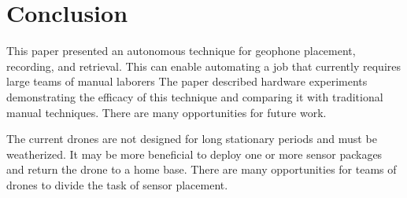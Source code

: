  \section{Conclusion}\label{sec:Conclusion}
This paper presented an autonomous technique for geophone placement, recording, and retrieval.  This can enable automating a job that currently requires large teams of manual laborers 
 The paper described hardware experiments demonstrating the efficacy of this technique and comparing it with traditional manual techniques.
 There are many opportunities for future work.  
 
 The current drones are not designed for long stationary periods and must be weatherized.  It may be more beneficial to deploy one or more sensor packages and return the drone to a home base.   There are many opportunities for teams of drones to divide the task of sensor placement.